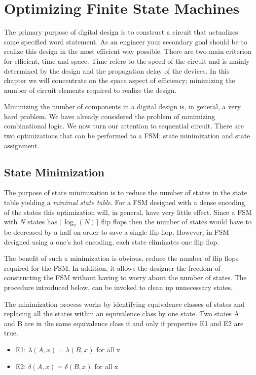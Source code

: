 \chapter{Optimizing Finite State Machines}
\label{chapter:Optimize Finite State Machines}
\graphicspath{ {./chapter11/Fig} }

The primary purpose of digital design is to construct a circuit that
actualizes some specified word statement.  As an engineer
your secondary goal should be to realize this design in the
most efficient way possible.  There are two main criterion for
efficient, time and space.  Time refers to the speed of the
circuit and is mainly determined by the design
and the propagation delay of the devices.  In
this chapter we will concentrate on the space aspect of 
efficiency; minimizing the number of circuit elements required
to realize the design.

Minimizing the number of components in a digital design is,
in general, a very hard problem.  We have already considered
the problem of minimizing combinational logic.  We now turn 
our attention to sequential circuit.  There are two optimizations 
that can be performed to a FSM; state minimization and state 
assignment.

\section{State Minimization}
The purpose of state minimization is to reduce the number
of states in the state table yielding a \textit{ minimal state
table}.  For a FSM designed with a dense 
encoding of the states this optimization will, in general, have 
very little effect. Since a FSM with $N$ states has 
$\lceil \log_2(N) \rceil$ flip flops then the number of states
would have to be decreased by a half on order to save a single
flip flop.  However, in FSM designed using a one's hot encoding,
each state eliminates one flip flop.

The benefit of such a minimization is obvious, reduce the 
number of flip flops required for the FSM.  In addition, it allows
the designer the freedom of constructing the FSM without
having to worry about the number of states.  The procedure
introduced below, can be invoked to clean up unnecessary states.

The minimization process works by identifying equivalence
classes of states and replacing all the states within
an equivalence class by one state.  Two states A and B are
in the same equivalence class if and only if properties
E1 and E2 are true.
\begin{itemize}
\item E1: $\lambda (A,x) = \lambda (B,x)$ for all x
\item E2: $\delta(A,x) = \delta(B,x)$ for all x
\end{itemize}


